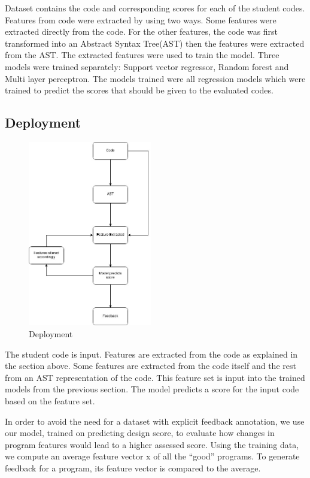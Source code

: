 \documentclass[conference]{IEEEtran}
\begin{document}
Dataset contains the code and corresponding scores for each of the student codes. Features from code were extracted by using two ways. Some features were extracted directly from the code. For the other features, the code was first transformed into an Abstract Syntax Tree(AST) then the features were extracted from the AST. The extracted features were used to train the model. Three models were trained separately: Support vector regressor, Random forest and Multi layer perceptron. The models trained were all regression models which were trained to predict the scores that should be given to the evaluated codes. 

\subsection{Deployment} 

\begin{figure}[h]
\centering
\includegraphics[width=0.48\textwidth]{./Deployment.jpg}
\caption{Deployment}
\label{fig1}
\end{figure}

The student code is input. Features are extracted from the code as explained in the section above. Some features are extracted from the code itself and the rest from an AST representation of the code. This feature set is input into the trained models from the previous section. The model predicts a score for the input code based on the feature set.

In order to avoid the need for a dataset with explicit feedback annotation, we use our model, trained on predicting design score, to evaluate how changes in program features would lead to a higher assessed score. Using the training data, we compute an average feature vector x of all the “good” programs. To generate feedback for a program, its feature vector is compared to the average.
\end{document}

